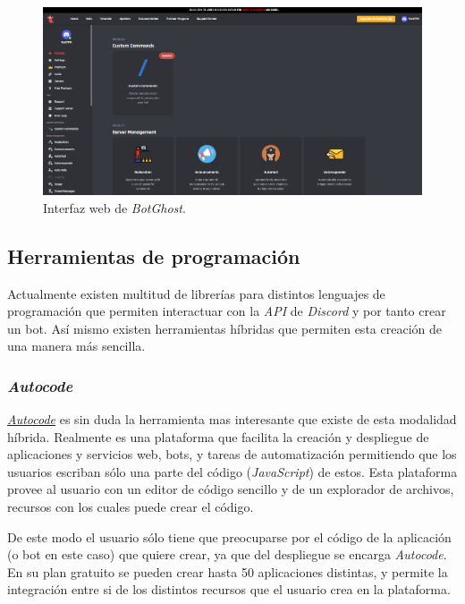 \FloatBarrier
\begin{figure}[h]
	\centering
	\includegraphics[width=1\textwidth]{img/botghost.png}
	\caption{Interfaz web de \textit{BotGhost}.}
\end{figure}
\FloatBarrier

\subsection{Herramientas de programación}

Actualmente existen multitud de librerías para distintos lenguajes de programación que permiten interactuar con la \textit{API} de \textit{Discord} y por tanto crear un bot. Así mismo existen herramientas híbridas que permiten esta creación de una manera más sencilla.

\subsubsection{\textit{Autocode}}

\href{https://autocode.com/}{\textit{Autocode}} es sin duda la herramienta mas interesante que existe de esta modalidad híbrida. Realmente es una plataforma que facilita la creación y despliegue de aplicaciones y servicios web, bots, y tareas de automatización permitiendo que los usuarios escriban sólo una parte del código (\textit{JavaScript}) de estos. Esta plataforma provee al usuario con un editor de código sencillo y de un explorador de archivos, recursos con los cuales puede crear el código.

De este modo el usuario sólo tiene que preocuparse por el código de la aplicación (o bot en este caso) que quiere crear, ya que del despliegue se encarga \textit{Autocode}. En su plan gratuito se pueden crear hasta 50 aplicaciones distintas, y permite la integración entre si de los distintos recursos que el usuario crea en la plataforma.

